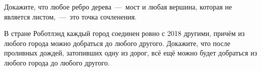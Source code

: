 \begin{exersize}
	Докажите, что любое ребро дерева~---~мост и любая вершина, которая не является листом,~---~это точка сочленения.
\end{exersize}

\begin{exersize}
	В стране Роботлэнд каждый город соединен ровно с 2018 другими, причём из любого города можно добраться до любого другого. Докажите, что после проливных дождей, затопивших одну из дорог, всё ещё можно будет добраться из любого города до любого другого.
\end{exersize}